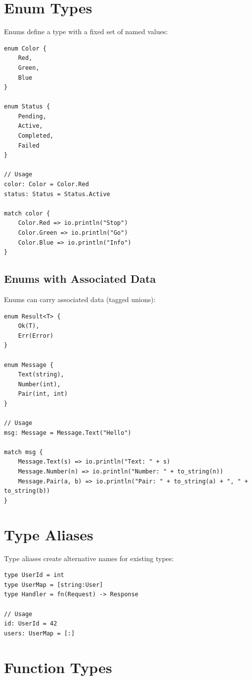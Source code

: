 \section{Enum Types}

Enums define a type with a fixed set of named values:

\begin{lstlisting}
enum Color {
    Red,
    Green,
    Blue
}

enum Status {
    Pending,
    Active,
    Completed,
    Failed
}

// Usage
color: Color = Color.Red
status: Status = Status.Active

match color {
    Color.Red => io.println("Stop")
    Color.Green => io.println("Go")
    Color.Blue => io.println("Info")
}
\end{lstlisting}

\subsection{Enums with Associated Data}

Enums can carry associated data (tagged unions):

\begin{lstlisting}
enum Result<T> {
    Ok(T),
    Err(Error)
}

enum Message {
    Text(string),
    Number(int),
    Pair(int, int)
}

// Usage
msg: Message = Message.Text("Hello")

match msg {
    Message.Text(s) => io.println("Text: " + s)
    Message.Number(n) => io.println("Number: " + to_string(n))
    Message.Pair(a, b) => io.println("Pair: " + to_string(a) + ", " + to_string(b))
}
\end{lstlisting}

\section{Type Aliases}

Type aliases create alternative names for existing types:

\begin{lstlisting}
type UserId = int
type UserMap = [string:User]
type Handler = fn(Request) -> Response

// Usage
id: UserId = 42
users: UserMap = [:]
\end{lstlisting}

\section{Function Types}

